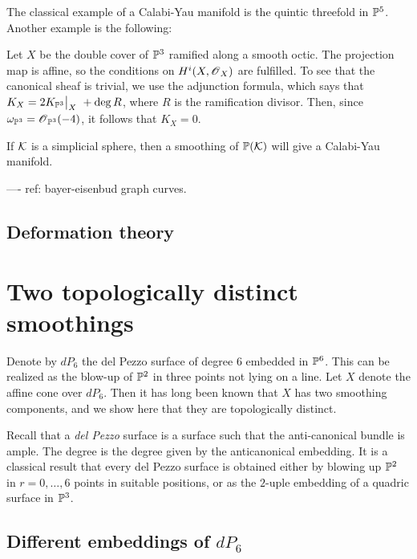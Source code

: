 \documentclass[11pt, english]{book}
\begin{document}
The classical example of a Calabi-Yau manifold is the quintic threefold in $\mathbb{P}^5$. Another example is the following:

\begin{example}
Let $X$ be the double cover of $\mathbb{P}^3$ ramified along a smooth octic. The projection map is affine, so the conditions on $H^i(X,\operatorname{\mathscr{O}}_X)$ are fulfilled. To see that the canonical sheaf is trivial, we use the adjunction formula, which says that $K_X= 2 \restr{K_{\PP^3}}{X} + \deg R$, where $R$ is the ramification divisor. Then, since $\omega_{\mathbb{P}^3}=\operatorname{\mathscr{O}}_{\mathbb{P}^3}(-4)$, it follows that $K_X=0$.
\end{example}

If $\mathcal K$ is a simplicial sphere, then a smoothing of $\mathbb{P}(\mathcal K)$ will give a Calabi-Yau manifold. 

---- ref: bayer-eisenbud graph curves.

\section{Deformation theory}

\chapter{Two topologically distinct smoothings}

Denote by $dP_6$ the del Pezzo surface of degree 6 embedded in $\mathbb{P}^6$. This can be realized as the blow-up of $\mathbb{P}^2$ in three points not lying on a line. Let $X$ denote the affine cone over $dP_6$. Then it has long been known that $X$ has two smoothing components, and we show here that they are topologically distinct.

Recall that a \emph{del Pezzo} surface is a surface such that the anti-canonical bundle is ample. The degree is the degree given by the anticanonical embedding. It is a classical result that every del Pezzo surface is obtained either by blowing up $\mathbb{P}^2$ in $r=0,\ldots,6$ points in suitable positions, or as the $2$-uple embedding of a quadric surface in $\mathbb{P}^3$. 

\section{Different embeddings of $dP_6$}
\end{document}
